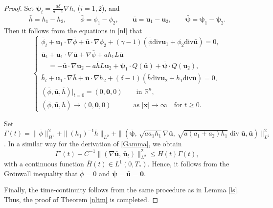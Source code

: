 \documentclass[10pt,a4paper]{amsart}
\DeclareMathOperator{\diver}{\mathrm{div}}
\begin{document}
\begin{proof}
Set 
$\boldsymbol{\psi}_i=\frac{a\delta}{\delta-1}\nabla h_i$ ($i=1,2$), and 
\begin{equation*}
\begin{aligned}
\bar{h}=h_1-h_2,\qquad \bar{\phi}= \phi_1-\phi_2,\qquad \bar{\boldsymbol{u}}=\boldsymbol{u}_1-\boldsymbol{u}_2, \qquad  \bar{\boldsymbol{\psi}}=\boldsymbol{\psi}_1-\boldsymbol{\psi}_2.
\end{aligned}
\end{equation*}
Then it follows from the equations in  \eqref{nl} that
\begin{equation}\label{eq:1.2wcvb}
\begin{cases}
\displaystyle
\bar{\phi}_t+\boldsymbol{u}_1\cdot \nabla\bar{\phi}+\bar{\boldsymbol{u}} \cdot\nabla\phi_2+(\gamma-1)(\bar{\phi}\mathrm{div}\boldsymbol{u}_1 +\phi_2\mathrm{div}\bar{\boldsymbol{u}})=0,\\[3pt]
 \displaystyle
\bar{\boldsymbol{u}}_t+ \boldsymbol{u}_1\cdot\nabla \bar{\boldsymbol{u}}+\nabla \bar{\phi}+ a h_1L\bar{\boldsymbol{u}} \\[3pt]
\displaystyle
\quad =- \bar{\boldsymbol{u}} \cdot \nabla \boldsymbol{u}_2- a \bar h L\boldsymbol{u}_2+ \boldsymbol{\psi}_1 \cdot Q( \bar{\boldsymbol{u}})+\bar{\boldsymbol{\psi}} \cdot Q(\boldsymbol{u}_2),\\[3pt]
\bar{h}_t+\boldsymbol{u}_1\cdot \nabla\bar{h}+\bar{\boldsymbol{u}}\cdot\nabla h_2+(\delta-1)(\bar{h} \mathrm{div}\boldsymbol{u}_2 +h_1\mathrm{div}\bar{\boldsymbol{u}})=0,\\[3pt]
\displaystyle
(\bar{\phi},\bar{\boldsymbol{u}},\bar{h})|_{t=0}=(0,\boldsymbol{0},0) \qquad \text{in $\mathbb{R}^n$},\\[3pt]
\displaystyle
(\bar{\phi},\bar{\boldsymbol{u}},\bar{h})\to (0,\boldsymbol{0},0) \qquad\quad \ \text{as $|\boldsymbol{x}|\to \infty$} \quad \text{for $t\geq 0$}.
\end{cases}
\end{equation}

Set 
$\varGamma(t)=\|\bar\phi\|_{H^1}^2
+\|(h_1)^{-1}\bar{h}\|_{L^2}+\|(\bar{\boldsymbol{\psi}},\, \sqrt{aa_1h_1}\nabla\bar{\boldsymbol{u}},\,\sqrt{a(a_1+a_2)h_1}\diver\bar{\boldsymbol{u}},\bar{\boldsymbol{u}})\|^2_{L^2}$. 
In a similar way for  the derivation of \eqref{Gamma}, we obtain
\begin{equation*}
\varGamma'(t)+C^{-1}\|(\nabla \bar{\boldsymbol{u}},\,\bar{\boldsymbol{u}}_t)\|^2_{L^2}
\leq \bar{H}(t)\varGamma(t),
\end{equation*}
with a continuous  function $\bar{H}(t)\in L^1(0,T_*)$. Hence, it follows from the Gr\"onwall inequality that
$\bar{\phi}=0$ and $\bar{\boldsymbol{\psi}}=\bar{\boldsymbol{u}}=\boldsymbol{0}$.



Finally, the time-continuity follows from the same procedure as in Lemma \ref{ls}. Thus, the proof of Theorem \ref{nltm} is completed.
\end{proof}
\end{document}
